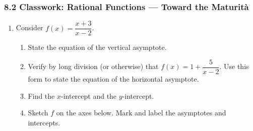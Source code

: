\documentclass[12pt, twoside]{article}
\begin{document}
\subsubsection*{8.2 Classwork: Rational Functions --- Toward the Maturit\`a}

\begin{enumerate}[itemsep=0.4cm]

\item[1.] Consider $\displaystyle f(x)=\dfrac{x+3}{x-2}$.

\begin{enumerate}[label=(\alph*), itemsep=0.3cm]
  \item State the equation of the vertical asymptote.

  \vspace{1.2cm}

  \item Verify by long division (or otherwise) that
  $\displaystyle f(x)=1+\dfrac{5}{x-2}$.
  Use this form to state the equation of the horizontal asymptote.

  \vspace{2.4cm}

  \item Find the $x$-intercept and the $y$-intercept.

  \vspace{2.7cm}

  \item Sketch $f$ on the axes below. Mark and label the asymptotes and intercepts.
\end{enumerate}

\begin{figure}[H]
\begin{center}
\end{center}
\end{figure}


\end{enumerate}
\end{document}
